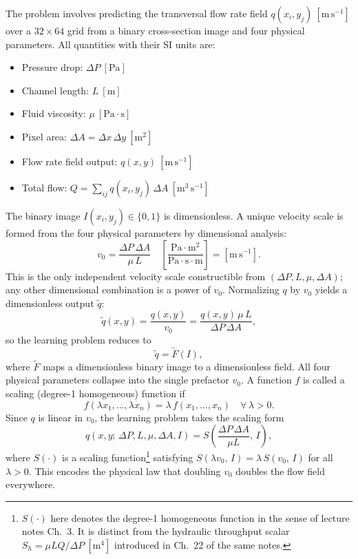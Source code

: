 \documentclass[conference,compsoc]{IEEEtran}
\begin{document}
The problem involves predicting the transversal flow rate field $q(x_i,y_j)\ [\mathrm{m\,s^{-1}}]$ over a $32\times64$ grid from a binary cross-section image and four physical parameters. All quantities with their SI units are:
\begin{itemize}
  \item Pressure drop: $\Delta P\ [\mathrm{Pa}]$
  \item Channel length: $L\ [\mathrm{m}]$
  \item Fluid viscosity: $\mu\ [\mathrm{Pa\cdot s}]$
  \item Pixel area: $\Delta A = \Delta x\,\Delta y\ [\mathrm{m^2}]$
  \item Flow rate field output: $q(x,y)\ [\mathrm{m\,s^{-1}}]$
  \item Total flow: $Q = \sum_{ij}q(x_i,y_j)\,\Delta A\ [\mathrm{m^3\,s^{-1}}]$
\end{itemize}
The binary image $I(x_i,y_j)\in\{0,1\}$ is dimensionless. A unique velocity scale is formed from the four physical parameters by dimensional analysis:
\begin{equation}
  v_0 = \frac{\Delta P\,\Delta A}{\mu\, L}
  \quad\left[\frac{\mathrm{Pa}\cdot\mathrm{m}^2}{\mathrm{Pa\cdot s}\cdot\mathrm{m}}\right]
  = \left[\mathrm{m\,s^{-1}}\right].
  \label{eq:v0}
\end{equation}
This is the only independent velocity scale constructible from $(\Delta P, L, \mu, \Delta A)$; any other dimensional combination is a power of $v_0$. Normalizing $q$ by $v_0$ yields a dimensionless output $\tilde{q}$:
\begin{equation}
  \tilde{q}(x,y) = \frac{q(x,y)}{v_0}
                 = \frac{q(x,y)\,\mu\, L}{\Delta P\,\Delta A},
  \label{eq:dimless}
\end{equation}
so the learning problem reduces to
\begin{equation}
  \tilde{q} = \tilde{F}(I),
  \label{eq:dimless-problem}
\end{equation}
where $\tilde{F}$ maps a dimensionless binary image to a dimensionless field. All four physical parameters collapse into the single prefactor $v_0$. A function $f$ is called a scaling (degree-1 homogeneous) function if
\begin{equation}
  f(\lambda x_1,\dots,\lambda x_n) = \lambda\,f(x_1,\dots,x_n)
  \quad \forall\,\lambda > 0.
  \label{eq:homogeneous-def}
\end{equation}
Since $q$ is linear in $v_0$, the learning problem takes the scaling form
\begin{equation}
  q(x,y;\,\Delta P,L,\mu,\Delta A,I)
  = S\!\left(\frac{\Delta P\,\Delta A}{\mu L},\,I\right),
  \label{eq:scaling-form}
\end{equation}
where $S(\cdot)$ is a scaling function\footnote{$S(\cdot)$ here denotes the degree-1 homogeneous function in the sense of lecture notes Ch.~3. It is distinct from the hydraulic throughput scalar $S_h = \mu L Q/\Delta P\ [\mathrm{m}^4]$ introduced in Ch.~22 of the same notes.} satisfying $S(\lambda v_0,\,I) = \lambda\,S(v_0,\,I)$ for all $\lambda>0$. This encodes the physical law that doubling $v_0$ doubles the flow field everywhere.
\end{document}
